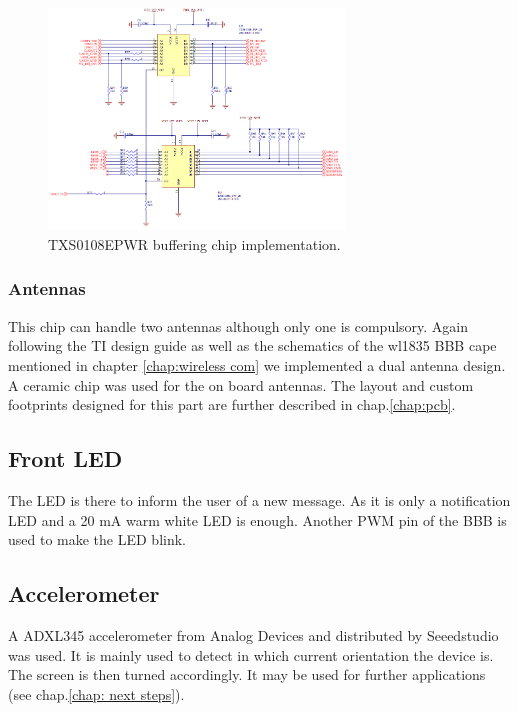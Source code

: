 \begin{figure}[!ht]
    \centering
    \includegraphics[width=0.7\textwidth,keepaspectratio]{chap/hardFig/wl_1835_buffer_sch}
    \caption{TXS0108EPWR buffering chip implementation.}
    \label{fig:buffering chip}
\end{figure}

\subsubsection{Antennas}
This chip can handle two antennas although only one is compulsory. Again following the TI design guide as well as the schematics of the wl1835 BBB cape mentioned in chapter \ref{chap:wireless com} we implemented a dual antenna design. A ceramic chip was used for the on board antennas. The layout and custom footprints designed for this part are further described in chap.\ref{chap:pcb}.


\subsection{Front LED}

The LED is there to inform the user of a new message. As it is only a notification LED and a 20 mA warm white LED is enough. Another PWM pin of the BBB is used to make the LED blink.


\subsection{Accelerometer}

A ADXL345 accelerometer from Analog Devices and distributed by Seeedstudio was used. It is mainly used to detect in which current orientation the device is. The screen is then turned accordingly. It may be used for further applications (see chap.\ref{chap: next steps}).

